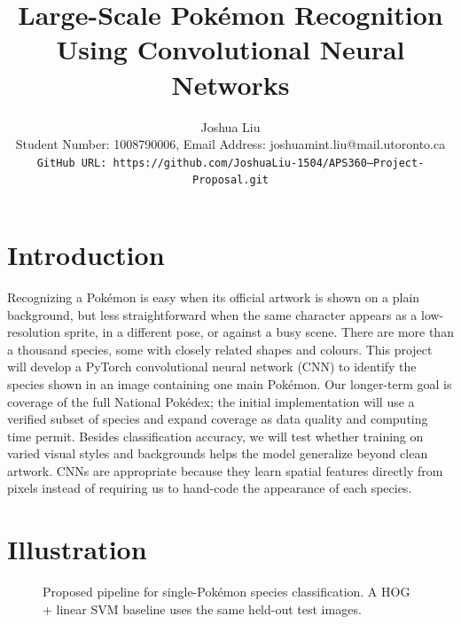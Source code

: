 \documentclass[final]{article}
\title{Large-Scale Pok\'emon Recognition Using Convolutional Neural Networks}
\author{Joshua Liu \\ Student Number: 1008790006, Email Address: joshuamint.liu@mail.utoronto.ca \\ \texttt{GitHub URL: https://github.com/JoshuaLiu-1504/APS360---Project-Proposal.git}}
\begin{document}
\maketitle
\vspace{-0.5in}
\section*{Introduction}
Recognizing a Pok\'emon is easy when its official artwork is shown on a plain background, but less straightforward when the same character appears as a low-resolution sprite, in a different pose, or against a busy scene. There are more than a thousand species, some with closely related shapes and colours. This project will develop a PyTorch convolutional neural network (CNN) to identify the species shown in an image containing one main Pok\'emon. Our longer-term goal is coverage of the full National Pok\'edex; the initial implementation will use a verified subset of species and expand coverage as data quality and computing time permit. Besides classification accuracy, we will test whether training on varied visual styles and backgrounds helps the model generalize beyond clean artwork. CNNs are appropriate because they learn spatial features directly from pixels instead of requiring us to hand-code the appearance of each species.
\section*{Illustration}
\begin{figure}[h]
\centering
{}
\vspace{-2mm}
\caption{Proposed pipeline for single-Pok\'emon species classification. A HOG + linear SVM baseline uses the same held-out test images.}
\label{fig:pipeline}
\vspace{-3mm}
\end{figure}
\end{document}
